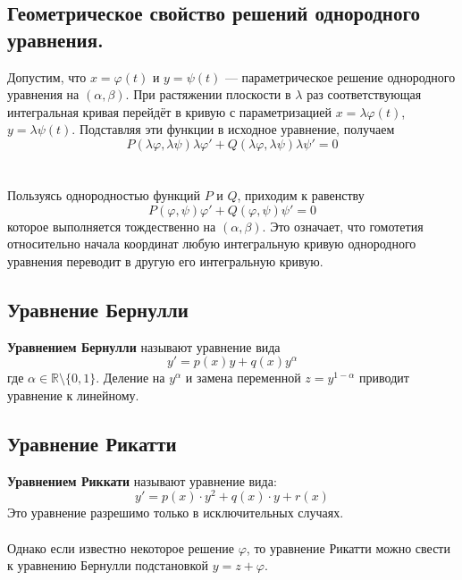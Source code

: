\documentclass{article}
\begin{document}
\subsection{Геометрическое свойство решений однородного уравнения.}
Допустим, что $x = \varphi(t)$ и $y = \psi(t)$ --- параметрическое решение однородного уравнения на $(\alpha, \beta)$. При растяжении
плоскости в $\lambda$ раз соответствующая интегральная кривая перейдёт в кривую с параметризацией $x = \lambda \varphi(t)$, $y = \lambda \psi(t)$. Подставляя эти функции в исходное уравнение, получаем
\begin{equation*}
    P(\lambda \varphi, \lambda \psi)\lambda \varphi' + Q(\lambda\varphi, \lambda\psi)\lambda\psi' = 0
\end{equation*}\\\\
Пользуясь однородностью функций $P$ и $Q$, приходим к равенству
\begin{equation*}
    P(\varphi, \psi)\varphi' + Q(\varphi, \psi)\psi' = 0
\end{equation*}
которое выполняется тождественно на $(\alpha, \beta)$. Это означает, что гомотетия относительно начала координат любую интегральную кривую однородного уравнения переводит в другую его интегральную кривую.

\subsection{Уравнение Бернулли}
\textbf{Уравнением Бернулли} называют уравнение вида
\begin{equation*}
    y' = p(x)y + q(x)y^{\alpha}
\end{equation*}
где $\alpha \in \mathbb{R}\setminus\{0, 1\}$. Деление на $y^{\alpha}$ и замена переменной $z = y^{1-\alpha}$ приводит уравнение к линейному.

\subsection{Уравнение Рикатти}
\textbf{Уравнением Риккати} называют уравнение вида:
\begin{equation*}
    y' = p(x)\cdot y^2 + q(x)\cdot y + r(x)
\end{equation*}
Это уравнение разрешимо только в исключительных случаях.\\\\
Однако если известно некоторое решение $\varphi$, то уравнение Рикатти можно свести к уравнению Бернулли подстановкой $y = z + \varphi$.
\end{document}
